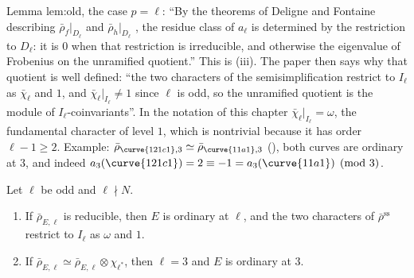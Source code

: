 \begin{paperlink}
Lemma lem:old, the case $p=\ell$: ``By the theorems of Deligne and Fontaine describing $\bar\rho_f|_{D_\ell}$ and $\bar\rho_h|_{D_\ell}$
\cite[\S2]{Edixhoven92}, the residue class of $a_\ell$ is determined by the restriction to $D_\ell$: it is $0$ when that restriction is irreducible,
and otherwise the eigenvalue of Frobenius on the unramified quotient.'' This is (iii). The paper then says why that quotient is
well defined: ``the two characters of the semisimplification restrict to $I_\ell$ as $\bar\chi_\ell$ and $1$, and $\bar\chi_\ell|_{I_\ell}\ne1$ since $\ell$ is odd, so the
unramified quotient is the module of $I_\ell$-coinvariants''. In the notation of this chapter $\bar\chi_\ell|_{I_\ell}=\omega$, the fundamental character of level $1$, which is
nontrivial because it has order $\ell-1\ge2$. Example:
$\bar\rho_{\curve{121c1},3}\simeq\bar\rho_{\curve{11a1},3}$ (), both curves are ordinary at $3$, and indeed
$a_3(\curve{121c1})=2\equiv-1=a_3(\curve{11a1})\pmod3$.
\end{paperlink}

\begin{corollary}\label{cor:galrep:ordinary}
Let $\ell$ be odd and $\ell\nmid N$.
\begin{enumerate}[label=(\roman*)]
\item If $\bar\rho_{E,\ell}$ is reducible, then $E$ is ordinary at $\ell$, and the two characters of $\bar\rho^{\mathrm{ss}}$ restrict to $I_\ell$ as $\omega$ and $1$.
\item If $\bar\rho_{E,\ell}\simeq\bar\rho_{E,\ell}\otimes\chi_{\ell^*}$, then $\ell=3$ and $E$ is ordinary at $3$.
\end{enumerate}
\end{corollary}

